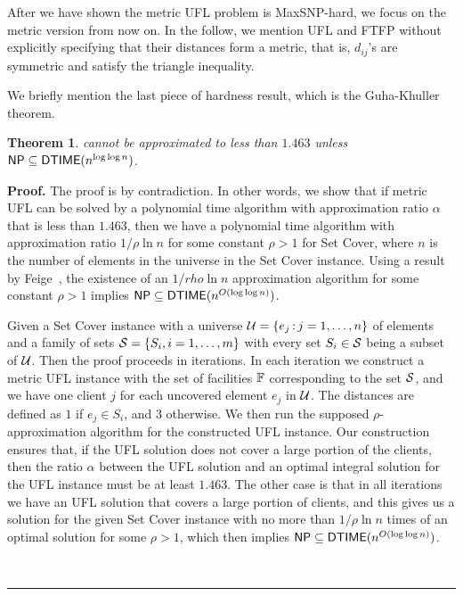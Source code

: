 \documentclass[oneside,final]{ucr}
\newtheorem{theorem}{Theorem}
\newenvironment{proof}[1][Proof]{\textbf{#1.} }{\ \rule{0.5em}{0.5em}}
\begin{document}
After we have shown the metric UFL problem is MaxSNP-hard, we focus on
the metric version from now on. In the follow, we mention UFL and FTFP
without explicitly specifying that their distances form a metric, that
is, $d_{ij}$'s are symmetric and satisfy the triangle inequality.

We briefly mention the last piece of hardness result, which is the
Guha-Khuller theorem.
\begin{theorem}\label{thm:1463}
  {\UFL} cannot be approximated to less than $1.463$ unless ${\mbox{\sf NP}}
  \subseteq {\mbox{\sf DTIME}}(n^{\log\log n})$.
\end{theorem}

\begin{proof}
  The proof is by contradiction. In other words, we show that if
  metric UFL can be solved by a polynomial time algorithm with
  approximation ratio $\alpha$ that is less than $1.463$, then we have
  a polynomial time algorithm with approximation ratio $1/\rho \ln n$
  for some constant $\rho > 1$ for Set Cover, where $n$ is the number
  of elements in the universe in the Set Cover instance. Using a
  result by Feige~\cite{Feige98}, the existence of an $1/rho \ln n$
  approximation algorithm for some constant $\rho > 1$ implies ${\mbox{\sf NP}}
  \subseteq {\mbox{\sf DTIME}}(n^{O(\log\log n)})$.

  Given a Set Cover instance with a universe $\calU = \{e_j \suchthat
  j=1,\ldots, n\}$ of elements and a family of sets $\calS = \{S_i,
  i=1,\ldots,m\}$ with every set $S_i \in \calS$ being a subset of
  $\calU$. Then the proof proceeds in iterations. In each iteration we
  construct a metric UFL instance with the set of facilities
  $\mathbb{F}$ corresponding to the set $\calS$, and we have one client
  $j$ for each uncovered element $e_j$ in $\calU$. The distances are
  defined as $1$ if $e_j \in S_i$, and $3$ otherwise. We then run the
  supposed $\rho$-approximation algorithm for the constructed UFL
  instance. Our construction ensures that, if the UFL solution does
  not cover a large portion of the clients, then the ratio $\alpha$
  between the UFL solution and an optimal integral solution for the
  UFL instance must be at least $1.463$. The other case is that in all
  iterations we have an UFL solution that covers a large portion of
  clients, and this gives us a solution for the given Set Cover
  instance with no more than $1/\rho \ln n$ times of an optimal
  solution for some $\rho > 1$, which then implies ${\mbox{\sf NP}} \subseteq
  {\mbox{\sf DTIME}}(n^{O(\log\log n)})$.


\end{proof}
\end{document}
